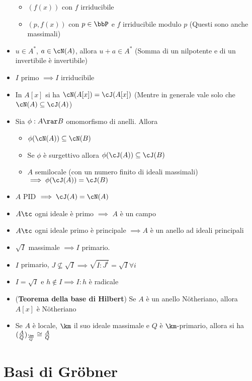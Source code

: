 \documentclass[a4paper,NoNotes,GeneralMath]{stdmdoc}
\begin{document}
\begin{itemize}
\begin{itemize}
				\item $(f(x))$ con $f$ irriducibile
				\item $(p, f(x))$ con $p \in \bbP$ e $f$ irriducibile modulo $p$ (Questi sono anche massimali)
			\end{itemize}
		\item $u \in A^*$, $a \in \cN(A)$, allora $u + a \in A^*$ (Somma di un nilpotente e di un invertibile è invertibile)
		\item $I$ primo $\implies I $ irriducibile
		\item In $A[x]$ si ha $\cN(A[x]) = \cJ(A[x])$ (Mentre in generale vale solo che $\cN(A) \subseteq \cJ(A)$)
		\item Sia $\phi: A \rar B$ omomorfismo di anelli. Allora
			\begin{itemize}
				\item $\phi(\cN(A)) \subseteq \cN(B)$
				\item Se $\phi$ è surgettivo allora $\phi(\cJ(A)) \subseteq \cJ(B)$
				\item $A$ semilocale (con un numero finito di ideali massimali) $\implies \phi(\cJ(A)) = \cJ(B)$
			\end{itemize}
		\item $A$ PID $\implies \cJ(A) = \cN(A)$
		\item $A \tc$ ogni ideale è primo $\implies$ $A$ è un campo
		\item $A \tc$ ogni ideale primo è principale $\implies A$ è un anello ad ideali principali
		\item $\sqrt{I}$ massimale $\implies I$ primario.
		\item $I$ primario, $J \not\subseteq \sqrt{I} \implies \sqrt{I : J^i} = \sqrt{I} \forall i$
		\item $I = \sqrt{I}$ e $h \notin I \implies I:h$ è radicale
		\item ({\bf Teorema della base di Hilbert}) Se $A$ è un anello Nötheriano, allora $A[x]$ è Nötheriano
		\item Se $A$ è locale, $\km$ il suo ideale massimale e $Q$ è $\km$-primario, allora si ha $(\frac{A}{Q})_{\frac{\km}{Q}} \cong \frac{A}{Q}$
	\end{itemize}
	
	\section*{Basi di Gröbner}
\end{document}
